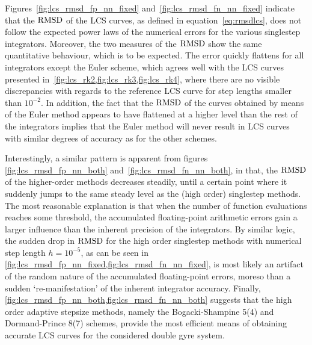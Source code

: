 Figures~\ref{fig:lcs_rmsd_fp_nn_fixed} and~\ref{fig:lcs_rmsd_fn_nn_fixed} indicate
that the $\operatorname{RMSD}$ of the LCS curves, as defined in equation~\eqref{eq:rmsdlcs},
does not follow the expected power laws of the numerical errors for the various
singlestep integrators. Moreover, the two measures of the $\operatorname{RMSD}$ show the
same quantitative behaviour, which is to be expected. The error quickly flattens
for all integrators except the Euler scheme, which agrees well with the LCS
curves presented in~\cref{fig:lcs_rk2,fig:lcs_rk3,fig:lcs_rk4},
where there are no visible discrepancies with regards to the reference LCS curve
for step lengths smaller than $10^{-2}$. In addition, the fact that the $\operatorname{RMSD}$
of the curves obtained by means of the Euler method appears to have flattened
at a higher level than the rest of the integrators implies that the Euler
method will never result in LCS curves with similar degrees of accuracy
as for the other schemes.









Interestingly, a similar pattern is apparent from figures
\ref{fig:lcs_rmsd_fp_nn_both} and~\ref{fig:lcs_rmsd_fn_nn_both}, in that, the
$\operatorname{RMSD}$ of the higher-order methods decreases steadily, until a certain point
where it suddenly jumps to the same steady level as the (high order) singlestep
methods. The most reasonable explanation is that when the number of function
evaluations reaches some threshold, the accumulated floating-point arithmetic
errors gain a larger influence than the inherent precision of the integrators.
By similar logic, the sudden drop in $\operatorname{RMSD}$ for the high order singlestep
methods with numerical step length $h=10^{-5}$, as can be seen in
\cref{fig:lcs_rmsd_fp_nn_fixed,fig:lcs_rmsd_fn_nn_fixed}, is most likely an
artifact of the random nature of the accumulated floating-point errors,
moreso than a sudden `re-manifestation' of the inherent integrator accuracy.
Finally, \cref{fig:lcs_rmsd_fp_nn_both,fig:lcs_rmsd_fn_nn_both} suggests that
the high order adaptive stepsize methods, namely the Bogacki-Shampine 5(4) and
Dormand-Prince 8(7) schemes, provide the most efficient means of obtaining
accurate LCS curves for the considered double gyre system.
\clearpage
